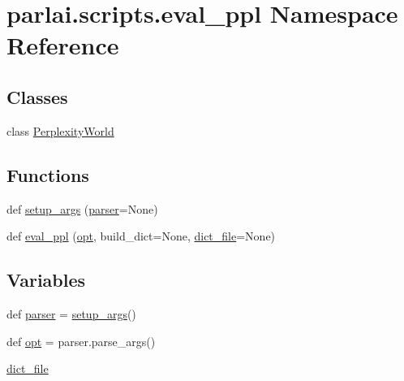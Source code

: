 \hypertarget{namespaceparlai_1_1scripts_1_1eval__ppl}{}\section{parlai.\+scripts.\+eval\+\_\+ppl Namespace Reference}
\label{namespaceparlai_1_1scripts_1_1eval__ppl}
\subsection*{Classes}
\begin{DoxyCompactItemize}
\item 
class \hyperlink{classparlai_1_1scripts_1_1eval__ppl_1_1PerplexityWorld}{Perplexity\+World}
\end{DoxyCompactItemize}
\subsection*{Functions}
\begin{DoxyCompactItemize}
\item 
def \hyperlink{namespaceparlai_1_1scripts_1_1eval__ppl_a4ae22cc04e19c46ed621afeba6e85d67}{setup\+\_\+args} (\hyperlink{namespaceparlai_1_1scripts_1_1eval__ppl_a01904cd2f6723523a01b996b43aa9fea}{parser}=None)
\item 
def \hyperlink{namespaceparlai_1_1scripts_1_1eval__ppl_ad1a8a8891f276136e82edc906ea58340}{eval\+\_\+ppl} (\hyperlink{namespaceparlai_1_1scripts_1_1eval__ppl_a0e79f76660ddfdf2c00a552f50edaec6}{opt}, build\+\_\+dict=None, \hyperlink{namespaceparlai_1_1scripts_1_1eval__ppl_a9f9177d01476851d8e9923f2c624fd4e}{dict\+\_\+file}=None)
\end{DoxyCompactItemize}
\subsection*{Variables}
\begin{DoxyCompactItemize}
\item 
def \hyperlink{namespaceparlai_1_1scripts_1_1eval__ppl_a01904cd2f6723523a01b996b43aa9fea}{parser} = \hyperlink{namespaceparlai_1_1scripts_1_1eval__ppl_a4ae22cc04e19c46ed621afeba6e85d67}{setup\+\_\+args}()
\item 
def \hyperlink{namespaceparlai_1_1scripts_1_1eval__ppl_a0e79f76660ddfdf2c00a552f50edaec6}{opt} = parser.\+parse\+\_\+args()
\item 
\hyperlink{namespaceparlai_1_1scripts_1_1eval__ppl_a9f9177d01476851d8e9923f2c624fd4e}{dict\+\_\+file}
\end{DoxyCompactItemize}


